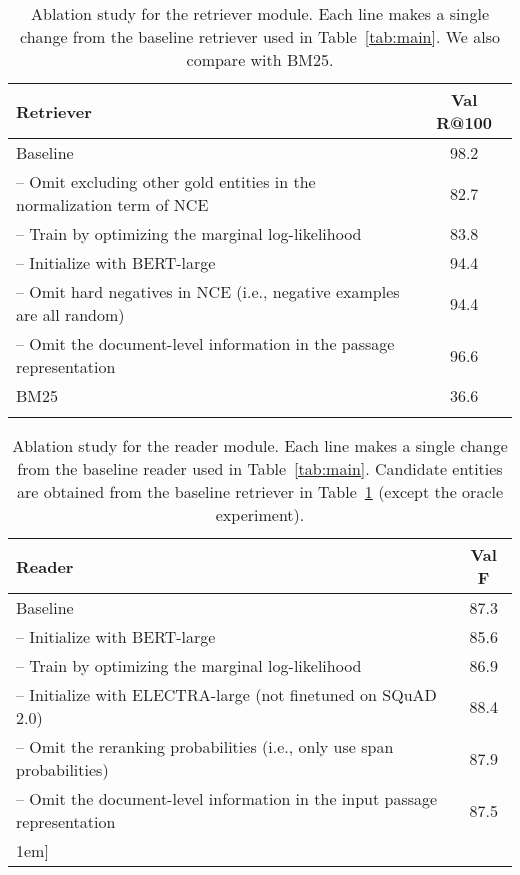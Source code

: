 \documentclass{article} \clearpage{}\usepackage{amsmath,amssymb,amsthm,bbm}
\theoremstyle{definition}
\begin{document}
\begin{table}[t]
  \setlength{\tabcolsep}{4pt}
  \renewcommand{\arraystretch}{1.1}
  \caption{Ablation study for the retriever module. Each line makes a single change from the baseline retriever used in Table~\ref{tab:main}.
    We also compare with BM25.}
  \label{tab:retriever}
  \small
  \begin{center}
    \begin{tabular}{lc}
      \Xhline{2\arrayrulewidth}
      Retriever & Val R@100 \\
      \hline
      Baseline & 98.2 \\
      -- Omit excluding other gold entities in the normalization term of NCE &  82.7 \\
      -- Train by optimizing the marginal log-likelihood  &  83.8 \\
      -- Initialize with BERT-large & 94.4 \\
      -- Omit hard negatives in NCE (i.e., negative examples are all random) & 94.4 \\
      -- Omit the document-level information  in the passage representation  &  96.6 \\
      \hline
      BM25 & 36.6 \\
      \Xhline{2\arrayrulewidth}
    \end{tabular}
  \end{center}
\end{table}


\begin{table}[t]
  \setlength{\tabcolsep}{4pt}
  \renewcommand{\arraystretch}{1.1}
  \caption{Ablation study for the reader module. Each line makes a single change from the baseline reader used in Table~\ref{tab:main}.
    Candidate entities are obtained from the baseline retriever in Table~\ref{tab:retriever} (except the oracle experiment).}
  \label{tab:reader}
  \small
  \begin{center}
    \begin{tabular}{lc}
      \Xhline{2\arrayrulewidth}
      Reader & Val F  \\
      \hline
      Baseline & 87.3 \\
      -- Initialize with BERT-large & 85.6 \\
      -- Train by optimizing the marginal log-likelihood  &  86.9 \\
      -- Initialize with ELECTRA-large (not finetuned on SQuAD 2.0) & 88.4 \\
      -- Omit the reranking probabilities  (i.e., only use span probabilities) &  87.9 \\
      -- Omit the document-level information  in the input passage representation  &  87.5 \\
      \hline  \-1em]
      \Xhline{2\arrayrulewidth}
    \end{tabular}
  \end{center}
\end{table}
\end{document}
